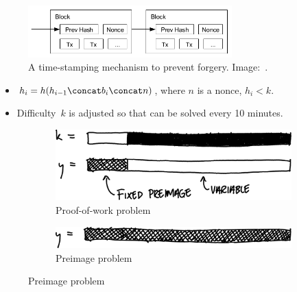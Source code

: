 \begin{frame}
  \begin{figure}
    \includegraphics[width=0.7\textwidth]{fig/bitcoin-pow.png}
    \caption{A time-stamping mechanism to prevent forgery.
    Image:~\cite{Nakamoto2008bap}.}
  \end{figure}
  
  \begin{solution}
    \begin{itemize}
      \item \(h_i = h(h_{i-1}\concat b_i\concat n)\),
        where \(n\) is a nonce, \(h_i < k\).
    \end{itemize}
  \end{solution}

  \pause

  \begin{remark}
    \begin{itemize}
      \item Difficulty~\(k\) is adjusted so that can be solved every 
        10 minutes.
    \end{itemize}
  \end{remark}
\end{frame}

\begin{frame}
  \begin{figure}
    \begin{subfigure}{0.8\columnwidth}
      \includegraphics[width=\columnwidth]{fig/pow.pdf}
      \caption{Proof-of-work problem}
    \end{subfigure}
    \vfill
    \begin{subfigure}{0.8\columnwidth}
      \includegraphics[width=\columnwidth]{fig/preimage.pdf}
      \caption{Preimage problem}
    \end{subfigure}
  \end{figure}
\end{frame}

